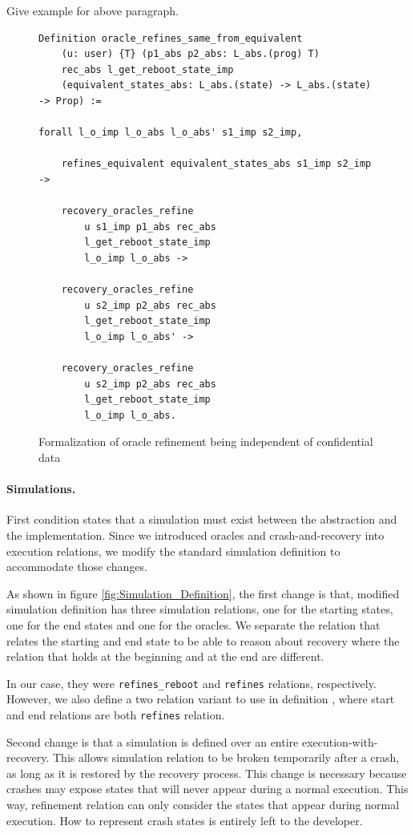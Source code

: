 {\color{red} Give example for above paragraph.}

\begin{figure}[ht]
\centering
\begin{verbatim}
Definition oracle_refines_same_from_equivalent
    (u: user) {T} (p1_abs p2_abs: L_abs.(prog) T)
    rec_abs l_get_reboot_state_imp
    (equivalent_states_abs: L_abs.(state) -> L_abs.(state) -> Prop) :=
    
forall l_o_imp l_o_abs l_o_abs' s1_imp s2_imp,

    refines_equivalent equivalent_states_abs s1_imp s2_imp ->

    recovery_oracles_refine 
        u s1_imp p1_abs rec_abs 
        l_get_reboot_state_imp 
        l_o_imp l_o_abs ->

    recovery_oracles_refine 
        u s2_imp p2_abs rec_abs 
        l_get_reboot_state_imp 
        l_o_imp l_o_abs' ->

    recovery_oracles_refine 
        u s2_imp p2_abs rec_abs 
        l_get_reboot_state_imp 
        l_o_imp l_o_abs.
\end{verbatim}
\caption{Formalization of oracle refinement being independent of confidential data}
\label{fig:ORS_Definition}
\end{figure}

\paragraph{Simulations.}
First condition states that a simulation must exist between the abstraction and the implementation. Since we introduced oracles and crash-and-recovery into execution relations, we modify the standard simulation definition to accommodate those changes. 

As shown in figure \ref{fig:Simulation_Definition}, the first change is that, modified simulation definition has three simulation relations, one for the starting states, one for the end states and one for the oracles. We separate the relation that relates the starting and end state to be able to reason about recovery where the relation that holds at the beginning and at the end are different. 

In our case, they were \texttt{refines\_reboot} and \texttt{refines} relations, respectively. However, we also define a two relation variant to use in definition  \label{fig:RDNI_Transfer_Definition}, where start and end relations are both \texttt{refines} relation.

Second change is that a simulation is defined over an entire execution-with-recovery. This allows simulation relation to be broken temporarily after a crash, as long as it is restored by the recovery process. This change is necessary because crashes may expose states that will never appear during a normal execution. This way, refinement relation can only consider the states that appear during normal execution. How to represent crash states is entirely left to the developer. 

